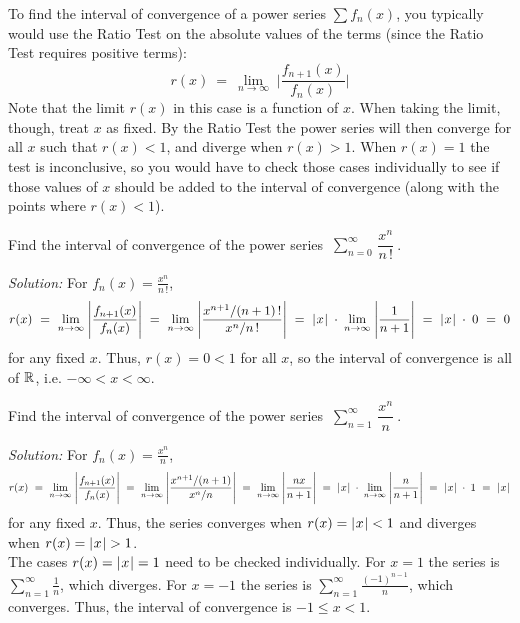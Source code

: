 To find the interval of convergence of a power series $\sum f_n(x)$, you
typically would use the Ratio Test on the absolute values of the terms (since
the Ratio Test requires positive terms):
\begin{equation}\label{eqn:ratiotestpower}
r(x) ~=~ \lim_{n \to \infty} \;\Biggl|\frac{f_{n+1}(x)}{f_n(x)}\Biggr|
\end{equation}
Note that the limit $r(x)$ in this case is a function of $x$. When taking the
limit, though, treat $x$ as fixed. By the Ratio Test the power series will then
converge for all $x$ such that $r(x) < 1$, and diverge when
$r(x)>1$. When $r(x)=1$ the test is inconclusive, so you would have
to check those cases individually to see if those values of $x$
should be added to the interval of convergence (along with the points where
$r(x) < 1$).
\newpage
\begin{exmp}\label{exmp:expseries}
\noindent Find the interval of convergence of the power series
$~\displaystyle\sum_{n=0}^{\infty} \,\dfrac{x^n}{n\,!}~$.\vspace{1mm}
\par\noindent\emph{Solution:} For $f_n(x) = \frac{x^n}{n\,!}$,
\[
r(x) ~=~ \lim_{n \to \infty} \;\Biggl|\frac{f_{n+1}(x)}{f_n(x)}\Biggr| ~=~
\lim_{n \to \infty} \;\Biggl|\frac{x^{n+1}/(n+1)\,!}{x^n/n\,!}\Biggr| ~=~
\lvert\mspace{1mu}x\mspace{1mu}\rvert \;\cdot\; \lim_{n \to \infty} \;\Biggl|\frac{1}{n+1}\Biggr| ~=~
\lvert\mspace{1mu}x\mspace{1mu}\rvert \;\cdot\; 0 ~=~ 0
\]
for any fixed $x$. Thus, $r(x) = 0 < 1$ for all $x$, so the interval of
convergence is all of $\mathbb{R}$, i.e. $-\infty < x < \infty$.
\end{exmp}
\begin{exmp}
\noindent Find the interval of convergence of the power series
$~\displaystyle\sum_{n=1}^{\infty} \,\dfrac{x^n}{n}~$.\vspace{1mm}
\par\noindent\emph{Solution:} For $f_n(x) = \frac{x^n}{n}$,
\[
r(x) ~=~ \lim_{n \to \infty} \;\Biggl|\frac{f_{n+1}(x)}{f_n(x)}\Biggr| ~=~
\lim_{n \to \infty} \;\Biggl|\frac{x^{n+1}/(n+1)}{x^n/n}\Biggr| ~=~
\lim_{n \to \infty} \;\Biggl|\frac{nx}{n+1}\Biggr| ~=~ \lvert\mspace{1mu}x\mspace{1mu}\rvert \;\cdot\;
\lim_{n \to \infty} \;\Biggl|\frac{n}{n+1}\Biggr| ~=~ \lvert\mspace{1mu}x\mspace{1mu}\rvert \;\cdot\; 1 ~=~ \lvert\mspace{1mu}x\mspace{1mu}\rvert
\]
for any fixed $x$. Thus, the series converges when $r(x) = \lvert\mspace{1mu}x\mspace{1mu}\rvert < 1$ and
diverges when $r(x) = \lvert\mspace{1mu}x\mspace{1mu}\rvert > 1$.\\The cases $r(x) = \lvert\mspace{1mu}x\mspace{1mu}\rvert = 1$ need to be
checked individually. For $x=1$ the series is $\sum_{n=1}^{\infty} \frac{1}{n}$,
which diverges. For $x=-1$ the series is
$\sum_{n=1}^{\infty} \frac{(-1)^{n-1}}{n}$, which converges. Thus, the interval of
convergence is $-1 \le x < 1$.
\end{exmp}
